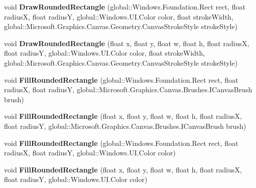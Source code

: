\begin{DoxyCompactItemize}
void {\bfseries Draw\+Rounded\+Rectangle} (global\+::\+Windows.\+Foundation.\+Rect rect, float radiusX, float radiusY, global\+::\+Windows.\+U\+I.\+Color color, float stroke\+Width, global\+::\+Microsoft.\+Graphics.\+Canvas.\+Geometry.\+Canvas\+Stroke\+Style stroke\+Style)
\item 
\mbox{\label{interface_microsoft_1_1_graphics_1_1_canvas_1_1_i_canvas_drawing_session_ae286fa627aa637fa115f69d968e0b91c}} 
void {\bfseries Draw\+Rounded\+Rectangle} (float x, float y, float w, float h, float radiusX, float radiusY, global\+::\+Windows.\+U\+I.\+Color color, float stroke\+Width, global\+::\+Microsoft.\+Graphics.\+Canvas.\+Geometry.\+Canvas\+Stroke\+Style stroke\+Style)
\item 
\mbox{\label{interface_microsoft_1_1_graphics_1_1_canvas_1_1_i_canvas_drawing_session_a7af8aba47096bd242ea560fec93ab1ef}} 
void {\bfseries Fill\+Rounded\+Rectangle} (global\+::\+Windows.\+Foundation.\+Rect rect, float radiusX, float radiusY, global\+::\+Microsoft.\+Graphics.\+Canvas.\+Brushes.\+I\+Canvas\+Brush brush)
\item 
\mbox{\label{interface_microsoft_1_1_graphics_1_1_canvas_1_1_i_canvas_drawing_session_a5c55fb3be927ecd824759f402bf841eb}} 
void {\bfseries Fill\+Rounded\+Rectangle} (float x, float y, float w, float h, float radiusX, float radiusY, global\+::\+Microsoft.\+Graphics.\+Canvas.\+Brushes.\+I\+Canvas\+Brush brush)
\item 
\mbox{\label{interface_microsoft_1_1_graphics_1_1_canvas_1_1_i_canvas_drawing_session_a2754a176d8e8d77579ccd174b869714d}} 
void {\bfseries Fill\+Rounded\+Rectangle} (global\+::\+Windows.\+Foundation.\+Rect rect, float radiusX, float radiusY, global\+::\+Windows.\+U\+I.\+Color color)
\item 
\mbox{\label{interface_microsoft_1_1_graphics_1_1_canvas_1_1_i_canvas_drawing_session_a0458a52d06f9947b206195167ddcfc73}} 
void {\bfseries Fill\+Rounded\+Rectangle} (float x, float y, float w, float h, float radiusX, float radiusY, global\+::\+Windows.\+U\+I.\+Color color)

\end{DoxyCompactItemize}
